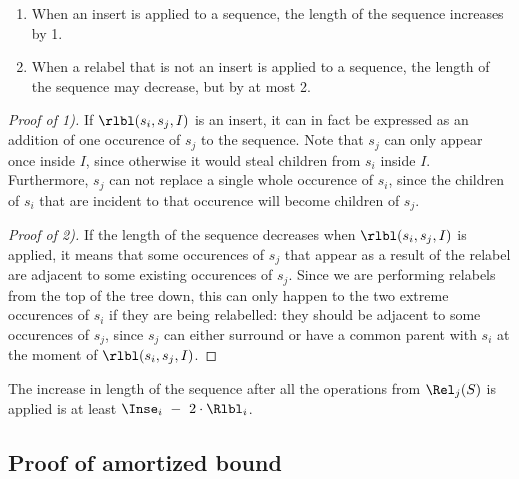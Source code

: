 \begin{lemma} \begin{enumerate}
	\item When an insert is applied to a \Ds sequence, the length of the sequence increases by 1.
	\item When a relabel that is not an insert is applied to a \Ds sequence, the length of the sequence may decrease, but by at most 2.
\end{enumerate} \end{lemma}

\begin{proof}[Proof of 1)] If $\rlbl (s_i, s_j, I)$ is an insert, it can in fact be expressed as an addition of one occurence of $s_j$ to the \Ds sequence. Note that $s_j$ can only appear once inside $I$, since otherwise it would steal children from $s_i$ inside $I$. Furthermore, $s_j$ can not replace a single whole occurence of $s_i$, since the children of $s_i$ that are incident to that occurence will become children of $s_j$.

{\itshape Proof of 2).} If the length of the sequence decreases when $\rlbl(s_i,s_j,I)$ is applied, it means that some occurences of $s_j$ that appear as a result of the relabel are adjacent to some existing occurences of $s_j$. Since we are performing relabels from the top of the tree down, this can only happen to the two extreme occurences of $s_i$ if they are being relabelled: they should be adjacent to some occurences of $s_j$, since $s_j$ can either surround or have a common parent with $s_i$ at the moment of $\rlbl(s_i,s_j,I)$. \end{proof}

\begin{corollary} \label{cor:rlblLength}
	The increase in length of the \Ds sequence after all the operations from $\Rel_j (S)$ is applied is at least $\Inse_i\ -\ 2 \cdot \Rlbl_i$.
\end{corollary}

\subsection{Proof of amortized bound}

\newcommand{\rjsz}{\left| \Rel_j (S) \right|}

